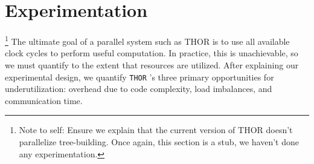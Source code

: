 \documentclass[twoside,leqno,twocolumn]{article}
\newcommand{\THOR}{{{\tt THOR}} }
\newcommand{\authornote}[1]{\footnote{Note to self: #1}}
\newcommand{\authorsnote}[1]{\authornote{#1}}
\begin{document}






\section{Experimentation}

\authorsnote{Ensure we explain that the current version of THOR doesn't parallelize tree-building.
Once again, this section is a stub, we haven't done any experimentation.}
The ultimate goal of a parallel system such as THOR is to use all available clock cycles to perform useful computation.
In practice, this is unachievable, so we must quantify to the extent that resources are utilized.
After explaining our experimental design, we quantify \THOR's three primary opportunities for underutilization: overhead due to code complexity, load imbalances, and communication time.
\end{document}
